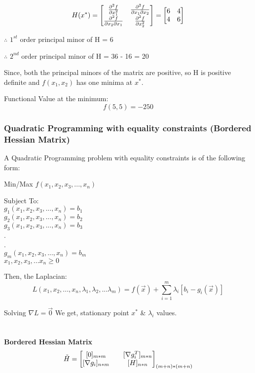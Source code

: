 \documentclass[12pt, letterpaper]{article}
\begin{document}
\begin{equation}
    H(x^*) = \begin{bmatrix}
\pdv[2]{f}{x_1} & \pdv{f}{x_1}{x_2} \\
\pdv{f}{x_2}{x_1} & \pdv[2]{f}{x_2} 
\end{bmatrix} = \begin{bmatrix}
6 & 4 \\
4 & 6
\end{bmatrix}
\end{equation}

$\therefore$ \hspace{0.2cm} $1^{st}$ order principal minor of H = 6

$\therefore$ \hspace{0.2cm} $2^{nd}$ order principal minor of H = 36 - 16 = 20

Since, both the principal minors of the matrix are positive, so H is positive definite and $f(x_1,x_2)$ has one minima at $x^*$.

Functional Value at the minimum:
$$ f(5,5) = -250 $$
\subsubsection{Quadratic Programming with equality constraints (Bordered Hessian Matrix)}

A Quadratic Programming problem with equality constraints is of the following form:

Min/Max $f(x_1,x_2,x_3,...,x_n)$

Subject To: \\
$ g_1(x_1,x_2,x_3,...,x_n) = b_1$ \\
$ g_2(x_1,x_2,x_3,...,x_n) = b_2$ \\
$ g_3(x_1,x_2,x_3,...,x_n) = b_3$ \\
. \\
. \\
$ g_m(x_1,x_2,x_3,...,x_n) = b_m$ \\
$x_1, x_2, x_3, ... x_n \geq 0 $

Then, the Laplacian:
    $$L(x_1,x_2,...,x_n,\lambda_1,\lambda_2, ... \lambda_m) = f(\overrightarrow x) + \sum_{i=1}^m \lambda_i [b_i - g_i(\overrightarrow x)]$$
    
    Solving $\nabla L = \overrightarrow 0$
    We get, stationary point $x^*$ \& $\lambda_i$ values.
    \\
    \\
    \\
\textbf{Bordered Hessian Matrix}
\begin{equation}
    \Tilde{H} = \begin{bmatrix}
    [0]_{m*m} && [\nabla g_i^T]_{m*n} \\ [\nabla g_i]_{n*m} && [H]_{n*n}
    \end{bmatrix}_{(m+n)*(m+n)}
\end{equation}
\end{document}
